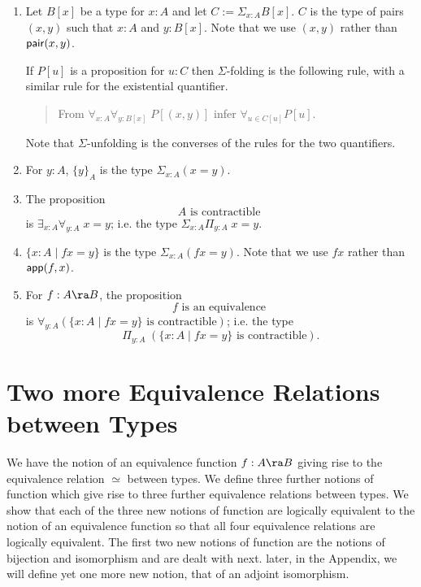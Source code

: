 \begin{notes}
$\;$
\begin{enumerate}
\item Let $B[x]$ be a type for $x:A$ and let $C:=\Sigma_{x:A}B[x]$.  $C$ is the type of pairs $(x,y)$ such that $x:A$ and $y:B[x]$.
Note that we use $(x,y)$ rather than ${\sf pair}(x,y)$.

If $P[u]$ is a proposition for $u: C$ then $\Sigma$-folding is the following rule, with a similar rule for the existential quantifier.
\begin{quote}
From $\forall_{x:A}\forall_{y:B[x]}\; P[{(x,y)}]$ infer $\forall_{u\in C[u]}P[u]$.
\end{quote}
Note that $\Sigma$-unfolding is the converses of the rules for the two quantifiers.
\item For $y:A$, $\{ y\}_A$ is the type $\Sigma_{x:A}(x=y)$.

\item The proposition 
  \[ A\mbox{ is contractible }\]
is $\exists_{x:A}\forall_{y:A}\; x=y$; i.e. the type $\Sigma_{x:A}\Pi_{y:A}\; x=y$.
\item $\{ x:A\mid fx =y\}$ is the type $\Sigma_{x:A}(fx = y)$.  Note that we use $fx$ rather than ${\sf app}(f,x)$.
\item For $f:A\ra B$, the proposition
  \[ f\mbox{ is an equivalence }\]
is $\forall_{y:A} (\{ x:A\mid fx=y\}\mbox{ is contractible})$; i.e. the type\\ 
  \[ \Pi_{y:A}\; (\{ x:A\mid fx=y\}\mbox{ is contractible}).\]



\end{enumerate}
\end{notes}

\section{Two more Equivalence Relations between Types}

We have the notion of an equivalence function $f:A\ra B$ giving rise to the equivalence relation $\simeq$ between types.  We define three further notions of function which give rise to three further equivalence relations between types.  We show that each of the three new notions of function are logically equivalent to the notion of an equivalence function so that all four equivalence relations are logically equivalent.  The first two new notions of function are the notions of bijection and isomorphism and are dealt with next.  later, in the Appendix, we will define yet one more new notion, that of an adjoint isomorphism.

